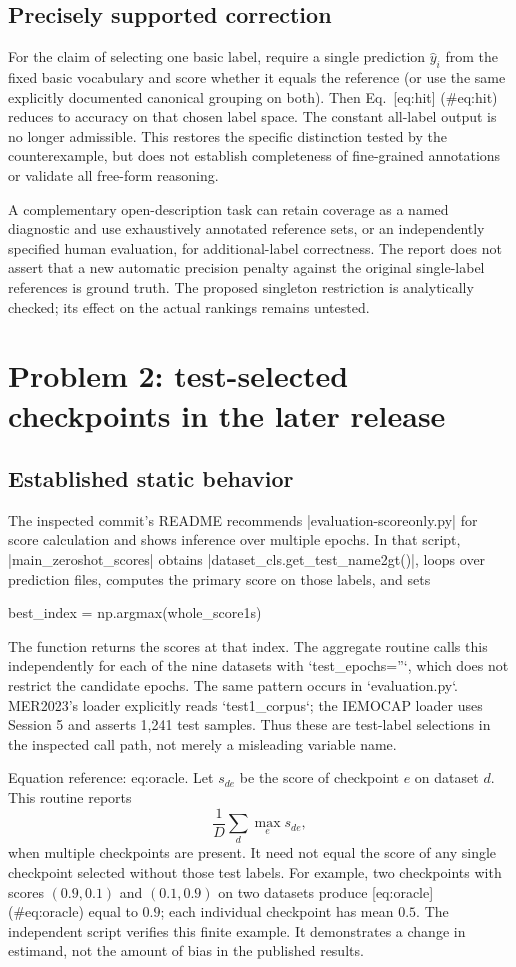 \documentclass[10pt]{article}
\begin{document}
\subsection*{Precisely supported correction}
For the claim of selecting one basic label, require a single prediction \(\widehat y_i\) from the fixed basic vocabulary and score whether it equals the reference (or use the same explicitly documented canonical grouping on both). Then Eq. [eq:hit] (\#eq:hit) reduces to accuracy on that chosen label space. The constant all-label output is no longer admissible. This restores the specific distinction tested by the counterexample, but does not establish completeness of fine-grained annotations or validate all free-form reasoning.\par
A complementary open-description task can retain coverage as a named diagnostic and use exhaustively annotated reference sets, or an independently specified human evaluation, for additional-label correctness. The report does not assert that a new automatic precision penalty against the original single-label references is ground truth. The proposed singleton restriction is analytically checked; its effect on the actual rankings remains untested.\par
\section*{Problem 2: test-selected checkpoints in the later release}
\subsection*{Established static behavior}
The inspected commit’s README recommends |evaluation-scoreonly.py| for score calculation and shows inference over multiple epochs. In that script, |main\_zeroshot\_scores| obtains |dataset\_cls.get\_test\_name2gt()|, loops over prediction files, computes the primary score on those labels, and sets\par
best\_index = np.argmax(whole\_score1s)\par
The function returns the scores at that index. The aggregate routine calls this independently for each of the nine datasets with `test\_epochs=”`, which does not restrict the candidate epochs. The same pattern occurs in `evaluation.py`. MER2023’s loader explicitly reads `test1\_corpus`; the IEMOCAP loader uses Session 5 and asserts 1,241 test samples. Thus these are test-label selections in the inspected call path, not merely a misleading variable name.\par
Equation reference: eq:oracle. Let \(s_{de}\) be the score of checkpoint \(e\) on dataset \(d\). This routine reports \[
 \frac1D\sum_d \max_e s_{de},\] when multiple checkpoints are present. It need not equal the score of any single checkpoint selected without those test labels. For example, two checkpoints with scores \((0.9,0.1)\) and \((0.1,0.9)\) on two datasets produce [eq:oracle] (\#eq:oracle) equal to \(0.9\); each individual checkpoint has mean \(0.5\). The independent script verifies this finite example. It demonstrates a change in estimand, not the amount of bias in the published results.\par
\end{document}
